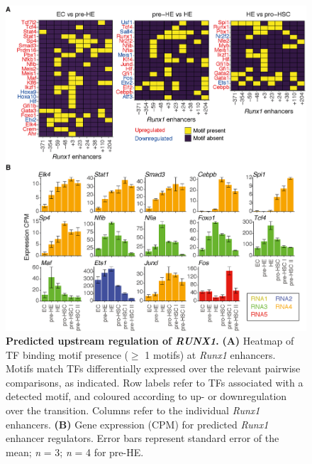 \begin{figure}[!t]
    \centering
    \includegraphics[width=\textwidth,height=\textheight,keepaspectratio]{figures/chapter3/ch3_runx1-motifs.png}
    \caption[{Predicted upstream regulation of \textit{RUNX1}.}]
    {\textbf{Predicted upstream regulation of \textit{RUNX1}.} 
    \textbf{(A)} Heatmap of TF binding motif presence ($\geq$ 1 motifs) at \textit{Runx1} enhancers. Motifs match TFs differentially expressed over the relevant pairwise comparisons, as indicated. Row labels refer to TFs associated with a detected motif, and coloured according to up- or downregulation over the transition. Columns refer to the individual \textit{Runx1} enhancers.
    \textbf{(B)} Gene expression (CPM) for predicted \textit{Runx1} enhancer regulators. Error bars represent standard error of the mean; \textit{n} = 3; \textit{n} = 4 for pre-HE. 
    }
    \label{fig:ch3_runx1-motifs}
\end{figure}


